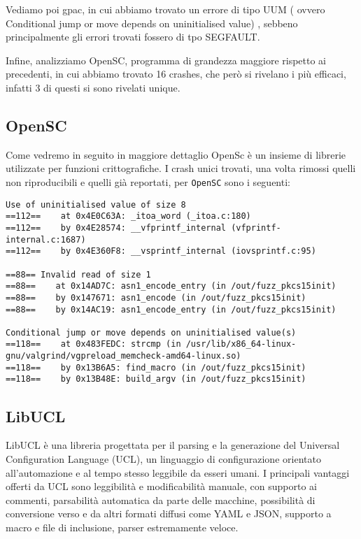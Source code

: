 Vediamo poi gpac, in cui abbiamo trovato un errore di tipo UUM ( ovvero Conditional jump or move depends on uninitialised value) , sebbeno principalmente gli errori trovati fossero di tpo SEGFAULT. 

Infine, analizziamo OpenSC, programma di grandezza maggiore rispetto ai precedenti, in cui abbiamo trovato 16 crashes, che però si rivelano i più efficaci, infatti 3 di questi si sono rivelati unique. 

\subsection{OpenSC}

Come vedremo in seguito in maggiore dettaglio OpenSc è un insieme di librerie utilizzate per funzioni crittografiche.
I crash unici trovati, una volta rimossi quelli non riproducibili e quelli già reportati, per \texttt{OpenSC} sono i seguenti:

\begin{verbatim}
Use of uninitialised value of size 8
==112==    at 0x4E0C63A: _itoa_word (_itoa.c:180)
==112==    by 0x4E28574: __vfprintf_internal (vfprintf-internal.c:1687)
==112==    by 0x4E360F8: __vsprintf_internal (iovsprintf.c:95)

==88== Invalid read of size 1
==88==    at 0x14AD7C: asn1_encode_entry (in /out/fuzz_pkcs15init)
==88==    by 0x147671: asn1_encode (in /out/fuzz_pkcs15init)
==88==    by 0x14AC19: asn1_encode_entry (in /out/fuzz_pkcs15init)

Conditional jump or move depends on uninitialised value(s)
==118==    at 0x483FEDC: strcmp (in /usr/lib/x86_64-linux-gnu/valgrind/vgpreload_memcheck-amd64-linux.so)
==118==    by 0x13B6A5: find_macro (in /out/fuzz_pkcs15init)
==118==    by 0x13B48E: build_argv (in /out/fuzz_pkcs15init)
\end{verbatim}

\subsection{LibUCL}

LibUCL è una libreria progettata per il parsing e la generazione del Universal Configuration Language (UCL), un linguaggio di configurazione orientato all’automazione e al tempo stesso leggibile da esseri umani.
I principali vantaggi offerti da UCL sono leggibilità e modificabilità manuale, con supporto ai commenti, parsabilità automatica da parte delle macchine, possibilità di conversione verso e da altri formati diffusi come YAML e JSON, supporto a macro e file di inclusione, parser estremamente veloce.

